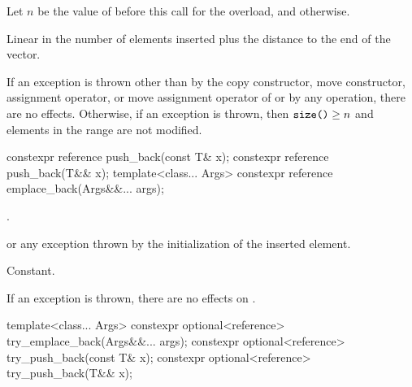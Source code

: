 \begin{itemdescr}
\pnum
Let $n$ be the value of  before this call for
the  overload, and
 otherwise.

\pnum
\complexity
Linear in the number of elements inserted plus
the distance to the end of the vector.

\pnum
\remarks
If an exception is thrown other than by the
copy constructor,
move constructor,
assignment operator, or
move assignment operator
of  or by
any  operation,
there are no effects.
Otherwise,
if an exception is thrown, then
$\tcode{size()} \ge n$ and
elements in the range  are not modified.
\end{itemdescr}

%
%
\begin{itemdecl}
constexpr reference push_back(const T& x);
constexpr reference push_back(T&& x);
template<class... Args>
  constexpr reference emplace_back(Args&&... args);
\end{itemdecl}

\begin{itemdescr}
\pnum
\returns
{}.

\pnum
\throws
{} or
any exception thrown by the initialization of the inserted element.

\pnum
\complexity
Constant.

\pnum
\remarks
If an exception is thrown, there are no effects on .
\end{itemdescr}

%
%
\begin{itemdecl}
template<class... Args>
  constexpr optional<reference> try_emplace_back(Args&&... args);
constexpr optional<reference> try_push_back(const T& x);
constexpr optional<reference> try_push_back(T&& x);
\end{itemdecl}

